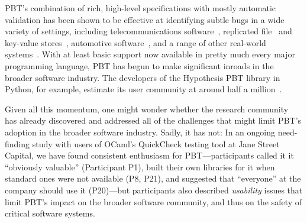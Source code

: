 PBT's combination of rich, high-level specifications with mostly
automatic validation has been shown to be effective at identifying subtle
bugs in a wide variety of settings, including telecommunications
software~\cite{arts2006testing}, replicated
file~\cite{MysteriesOfDropbox2016} and key-value
stores~\cite{Bornholt2021}, automotive software~\cite{arts2015testing}, and a range
of other real-world systems~\cite{hughes2016experiences}. With at
least basic support
now available in pretty much every major programming language\iflater {}\fi, PBT has
begun to make significant inroads in the broader software
industry.  The developers of the Hypothesis PBT library in
Python, for example, estimate its user community at around half a
million~\cite{ZacPersonalCommunication}.  \iflater{}\fi


\newcommand{\participant}[1]{{P#1}}

Given all this momentum, one might wonder whether the research community
has already discovered and addressed all of the challenges that might limit PBT's adoption
in the broader software industry.  Sadly, it has not:
In an ongoing need-finding study with users of OCaml's QuickCheck testing tool
at Jane Street Capital, we have found
consistent enthusiasm for PBT---participants called it it
``obviously valuable'' (Participant \participant{1}),
built their own libraries for it when standard ones were not available
(\participant{8},
\participant{21}), and suggested that ``everyone'' at the company should use it
(\participant{20})---but participants also described {\em usability} issues that
limit PBT's impact on the broader software community, and thus on the safety of
critical software systems.

